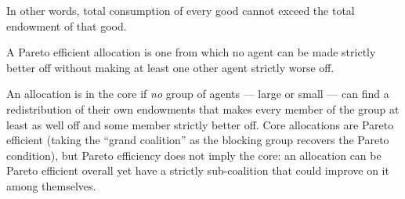 
In other words, total consumption of every good cannot exceed the
total endowment of that good.


A Pareto efficient allocation is one from which no agent can be made
strictly better off without making at least one other agent strictly
worse off.


An allocation is in the core if \emph{no} group of agents — large or
small — can find a redistribution of their own endowments that makes
every member of the group at least as well off and some member strictly
better off. Core allocations are Pareto efficient (taking the
``grand coalition'' as the blocking group recovers the Pareto
condition), but Pareto efficiency does not imply the core: an
allocation can be Pareto efficient overall yet have a strictly
sub-coalition that could improve on it among themselves.

